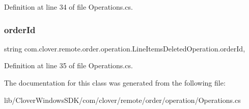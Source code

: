 Definition at line 34 of file Operations.\+cs.

\mbox{\label{classcom_1_1clover_1_1remote_1_1order_1_1operation_1_1_line_items_deleted_operation_a23db6d8c7b059e21bbda7ad5c97e83c1}} 
\subsubsection{\texorpdfstring{order\+Id}{orderId}}
{\footnotesize\ttfamily string com.\+clover.\+remote.\+order.\+operation.\+Line\+Items\+Deleted\+Operation.\+order\+Id\hspace{0.3cm}{\ttfamily [get]}, {\ttfamily [set]}}



Definition at line 35 of file Operations.\+cs.



The documentation for this class was generated from the following file\+:\begin{DoxyCompactItemize}
\item 
lib/\+Clover\+Windows\+S\+D\+K/com/clover/remote/order/operation/Operations.\+cs\end{DoxyCompactItemize}
